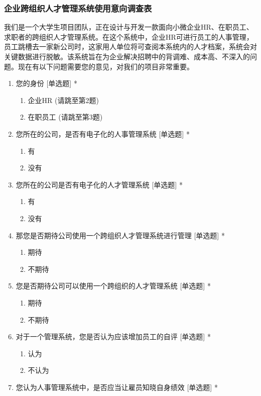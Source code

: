 \documentclass[UTF8]{ctexart}
\begin{document}
\subsubsection{企业跨组织人才管理系统使用意向调查表}
我们是一个大学生项目团队，正在设计与开发一款面向小微企业HR、在职员工、求职者的跨组织人才管理系统。在这个系统中，企业HR可进行员工的人事管理，员工跳槽去一家新公司时，这家用人单位将可查阅本系统内的人才档案，系统会对关键数据进行脱敏。该系统旨在为企业解决招聘中的背调难、成本高、不深入的问题。现在有以下问题需要您的意见，对我们的项目非常重要。
\begin{enumerate}[1.]
	\item 您的身份 [单选题] *
	\begin{enumerate}
		\item 企业HR (请跳至第2题)
		\item 在职员工 (请跳至第3题)
	\end{enumerate}
	\item 您所在的公司，是否有电子化的人事管理系统 [单选题] *
	\begin{enumerate}
		\item 有
		\item 没有
	\end{enumerate}
	\item 您所在的公司是否有电子化的人才管理系统 [单选题] *
	\begin{enumerate}
		\item 有
		\item 没有
	\end{enumerate}
	\item 那您是否期待公司使用一个跨组织人才管理系统进行管理 [单选题] *
	\begin{enumerate}
		\item 期待
		\item 不期待
	\end{enumerate}
	\item 您是否期待公司可以使用一个跨组织的人才管理系统 [单选题] *
	\begin{enumerate}
		\item 期待
		\item 不期待
	\end{enumerate}
	\item 对于一个管理系统，您是否认为应该增加员工的自评 [单选题] *
	\begin{enumerate}
		\item 认为
		\item 不认为
	\end{enumerate}
	\item 您认为人事管理系统中，是否应当让雇员知晓自身绩效 [单选题] *

\end{enumerate}
\end{document}
